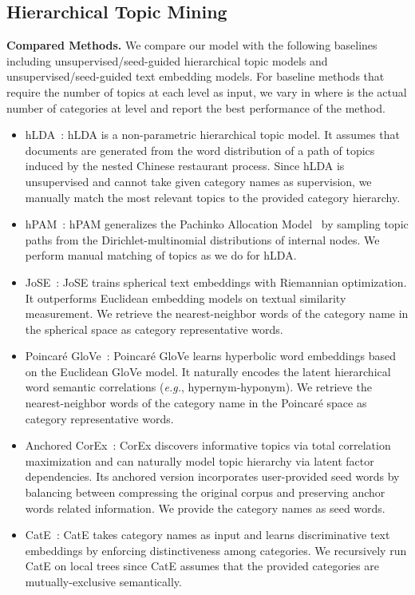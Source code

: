 \documentclass[sigconf]{acmart}
\newcommand{\eg}{\emph{e.g.}}
\theoremstyle{definition}
\begin{document}
\subsection{Hierarchical Topic Mining}
\noindent
\textbf{Compared Methods.} We compare our model with the following baselines including unsupervised/seed-guided hierarchical topic models and unsupervised/seed-guided text embedding models. For baseline methods that require the number of topics  at each level  as input, we vary  in  where  is the actual number of categories at level  and report the best performance of the method.
\begin{itemize}[wide, labelwidth=!, labelindent=0pt] 
\item hLDA~\cite{Blei2003HierarchicalTM}: hLDA is a non-parametric hierarchical topic model. It assumes that documents are generated from the word distribution of a path of topics induced by the nested Chinese restaurant process. Since hLDA is unsupervised and cannot take given category names as supervision, we manually match the most relevant topics to the provided category hierarchy.
\item hPAM~\cite{Mimno2007MixturesOH}: hPAM generalizes the Pachinko Allocation Model~\cite{li2006pachinko} by sampling topic paths from the Dirichlet-multinomial distributions of internal nodes. We perform manual matching of topics as we do for hLDA.
\item JoSE~\cite{meng2019spherical}: JoSE trains spherical text embeddings with Riemannian optimization. It outperforms Euclidean embedding models on textual similarity measurement. We retrieve the nearest-neighbor words of the category name in the spherical space as category representative words.
\item Poincar{\'e} GloVe~\cite{Tifrea2019PoincareGH}: Poincar{\'e} GloVe learns hyperbolic word embeddings based on the Euclidean GloVe model. It naturally encodes the latent hierarchical word semantic correlations (\eg, hypernym-hyponym). We retrieve the nearest-neighbor words of the category name in the Poincar{\'e} space as category representative words.
\item Anchored CorEx~\cite{Gallagher2017AnchoredCE}:
CorEx discovers informative topics via total correlation maximization and can naturally model topic hierarchy via latent factor dependencies. Its anchored version incorporates user-provided seed words by balancing between compressing the original corpus and preserving anchor words related information. We provide the category names as seed words.
\item CatE~\cite{Meng2020DiscriminativeTM}: CatE takes category names as input and learns discriminative text embeddings by enforcing distinctiveness among categories. We recursively run CatE on local trees since CatE assumes that the provided categories are mutually-exclusive semantically.
\end{itemize}
\end{document}
